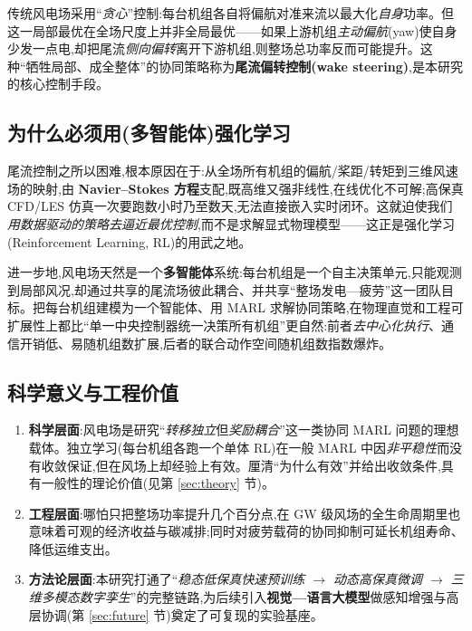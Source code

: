 \documentclass[12pt,a4paper]{article}
\theoremstyle{definition}
\theoremstyle{plain}
\begin{document}
传统风电场采用“\emph{贪心}”控制:每台机组各自将偏航对准来流以最大化\emph{自身}功率。但这一局部最优在全场尺度上并非全局最优——如果上游机组\emph{主动偏航}(yaw)使自身少发一点电,却把尾流\emph{侧向偏转}离开下游机组,则整场总功率反而可能提升。这种“牺牲局部、成全整体”的协同策略称为\textbf{尾流偏转控制(wake steering)},是本研究的核心控制手段。

\subsection{为什么必须用(多智能体)强化学习}

尾流控制之所以困难,根本原因在于:从全场所有机组的偏航/桨距/转矩到三维风速场的映射,由 \textbf{Navier--Stokes 方程}支配\cite{theory},既高维又强非线性,在线优化不可解;高保真 CFD/LES 仿真一次要跑数小时乃至数天,无法直接嵌入实时闭环。这就迫使我们\emph{用数据驱动的策略去逼近最优控制},而不是求解显式物理模型——这正是强化学习(Reinforcement Learning, RL)的用武之地。

进一步地,风电场天然是一个\textbf{多智能体}系统:每台机组是一个自主决策单元,只能观测到局部风况,却通过共享的尾流场彼此耦合、并共享“整场发电—疲劳”这一团队目标。把每台机组建模为一个智能体、用 MARL 求解协同策略,在物理直觉和工程可扩展性上都比“单一中央控制器统一决策所有机组”更自然:前者\emph{去中心化执行}、通信开销低、易随机组数扩展,后者的联合动作空间随机组数指数爆炸。

\subsection{科学意义与工程价值}

\begin{enumerate}[leftmargin=1.6em,itemsep=2pt]
  \item \textbf{科学层面}:风电场是研究“\emph{转移独立}但\emph{奖励耦合}”这一类协同 MARL 问题的理想载体。独立学习(每台机组各跑一个单体 RL)在一般 MARL 中因\emph{非平稳性}而没有收敛保证,但在风场上却经验上有效。厘清“为什么有效”并给出收敛条件,具有一般性的理论价值(见第 \ref{sec:theory} 节)。
  \item \textbf{工程层面}:哪怕只把整场功率提升几个百分点,在 GW 级风场的全生命周期里也意味着可观的经济收益与碳减排;同时对疲劳载荷的协同抑制可延长机组寿命、降低运维支出。
  \item \textbf{方法论层面}:本研究打通了“\emph{稳态低保真快速预训练 $\to$ 动态高保真微调 $\to$ 三维多模态数字孪生}”的完整链路,为后续引入\textbf{视觉—语言大模型}做感知增强与高层协调(第 \ref{sec:future} 节)奠定了可复现的实验基座。
\end{enumerate}
\end{document}
